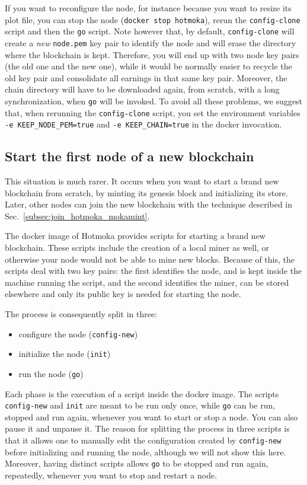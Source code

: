 \begin{commentbox}
If you want to reconfigure the node, for instance because you want to resize its plot file,
you can stop the node (\texttt{docker stop hotmoka}), rerun the \texttt{config-clone} script
and then the \texttt{go} script. Note however that, by default, \texttt{config-clone} will
create a \emph{new} \texttt{node.pem} key pair to identify the node and will
erase the directory where the blockchain is kept. Therefore, you will end up with two
node key pairs (the old one and the new one), while it would be normally easier to recycle the old key
pair and consolidate all earnings in that same key pair. Moreover, the chain directory will have to be
downloaded again, from scratch, with a long synchronization, when \texttt{go} will be invoked.
To avoid all these problems, we suggest that, when rerunning the \texttt{config-clone} script, you set
the environment variables \texttt{-e KEEP\_NODE\_PEM=true} and \texttt{-e KEEP\_CHAIN=true}
in the docker invocation.

\end{commentbox}

\subsection{Start the first node of a new blockchain}\label{subsec:start_hotmoka_mokamint}

This situation is much rarer. It occurs when you want to start a brand new blockchain from scratch,
by minting its genesis block and initializing its store. Later, other nodes can join the new blockchain
with the technique described in Sec.~\ref{subsec:join_hotmoka_mokamint}.

The docker image of Hotmoka provides scripts for starting a brand new blockchain.
These scripts include the creation of a local miner as well, or otherwise your node
would not be able to mine new blocks. Because of this, the scripts deal with two key pairs:
the first identifies the node, and is kept inside the machine running the script,
and the second identifies the miner, can be stored elsewhere and only
its public key is needed for starting the node.

The process is consequently split in three:
%
\begin{itemize}
\item configure the node (\texttt{config-new})
\item initialize the node (\texttt{init})
\item run the node (\texttt{go})
\end{itemize}
%
Each phase is the execution of a script inside the docker image. The scripts \texttt{config-new}
and \texttt{init} are meant to be run only once, while \texttt{go} can be run, stopped and run again,
whenever you want to start or stop a node. You can also pause it and unpause it.
The reason for splitting the process in three scripts is that it allows one to manually edit
the configuration created by \texttt{config-new} before initializing and running the node,
although we will not show this here. Moreover, having distinct scripts allows \texttt{go}
to be stopped and run again, repeatedly, whenever you want to stop and restart a node.

